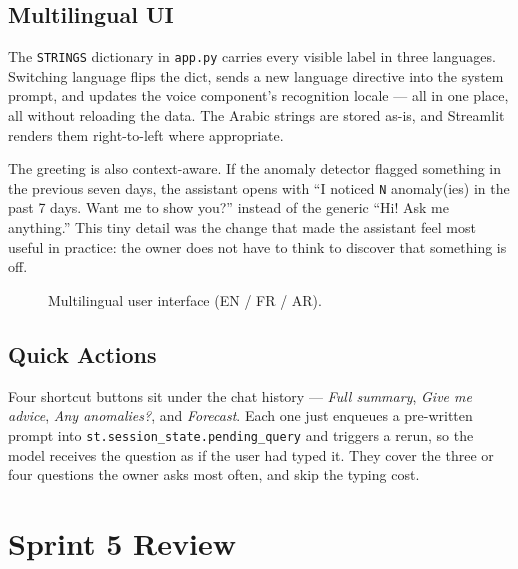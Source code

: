 \subsection{Multilingual UI}

The \texttt{STRINGS} dictionary in \texttt{app.py} carries every visible
label in three languages. Switching language flips the dict, sends a new
language directive into the system prompt, and updates the voice
component's recognition locale --- all in one place, all without
reloading the data. The Arabic strings are stored as-is, and Streamlit
renders them right-to-left where appropriate.

The greeting is also context-aware. If the anomaly detector flagged
something in the previous seven days, the assistant opens with
``I noticed \texttt{N} anomaly(ies) in the past 7 days. Want me to show
you?'' instead of the generic ``Hi! Ask me anything.'' This tiny detail
was the change that made the assistant feel most useful in practice:
the owner does not have to think to discover that something is off.

\begin{figure}[H]
  \centering
  \caption{Multilingual user interface (EN / FR / AR).}
  \label{fig:chatbot_langs}
\end{figure}

\subsection{Quick Actions}

Four shortcut buttons sit under the chat history --- \textit{Full
summary}, \textit{Give me advice}, \textit{Any anomalies?}, and
\textit{Forecast}. Each one just enqueues a pre-written prompt into
\texttt{st.session\_state.pending\_query} and triggers a rerun, so the
model receives the question as if the user had typed it. They cover the
three or four questions the owner asks most often, and skip the typing
cost.

\section{Sprint 5 Review}

